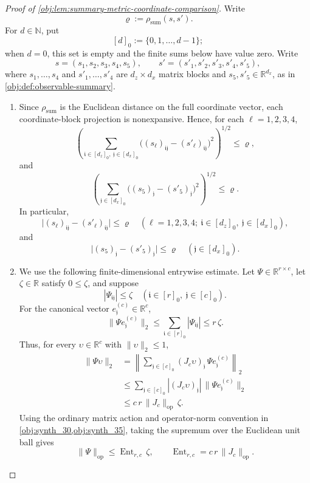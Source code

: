 \documentclass[11pt]{article}
\begin{document}
\begin{proof}[Proof of \cref{obj:lem:summary-metric-coordinate-comparison}]
Write
\[
\varrho:=\rho_{\mathrm{sum}}(s,s').
\]
For \(d\in\mathbb N\), put
\[
[d]_0:=\{0,1,\ldots,d-1\};
\]
when \(d=0\), this set is empty and the finite sums below have value zero.  Write
\[
s=(s_1,s_2,s_3,s_4,s_5),
\qquad
s'=(s'_1,s'_2,s'_3,s'_4,s'_5),
\]
where \(s_1,\ldots,s_4\) and \(s'_1,\ldots,s'_4\) are \(d_z\times d_x\) matrix
blocks and \(s_5,s'_5\in\mathbb R^{d_x}\), as in
\cref{obj:def:observable-summary}.

\begin{enumerate}
\item Since \(\rho_{\mathrm{sum}}\) is the Euclidean distance on the full
coordinate vector, each coordinate-block projection is nonexpansive.  Hence,
for each \(\ell=1,2,3,4\),
\[
\left(
  \sum_{\mathfrak i\in[d_z]_0,\ \mathfrak j\in[d_x]_0}
  \bigl((s_\ell)_{\mathfrak i\mathfrak j}
        -(s'_\ell)_{\mathfrak i\mathfrak j}\bigr)^2
\right)^{1/2}
\le \varrho,
\]
and
\[
\left(
  \sum_{\mathfrak j\in[d_x]_0}
  \bigl((s_5)_{\mathfrak j}-(s'_5)_{\mathfrak j}\bigr)^2
\right)^{1/2}
\le \varrho .
\]
In particular,
\[
\bigl|(s_\ell)_{\mathfrak i\mathfrak j}
      -(s'_\ell)_{\mathfrak i\mathfrak j}\bigr|
\le \varrho
\quad
(\ell=1,2,3,4;\ \mathfrak i\in[d_z]_0,\ \mathfrak j\in[d_x]_0),
\]
and
\[
\bigl|(s_5)_{\mathfrak j}-(s'_5)_{\mathfrak j}\bigr|
\le \varrho
\quad(\mathfrak j\in[d_x]_0).
\]

\item We use the following finite-dimensional entrywise estimate.  Let
\(\Psi\in\mathbb R^{r\times c}\), let \(\zeta\in\mathbb R\) satisfy
\(0\le\zeta\), and suppose
\[
|\Psi_{\mathfrak i\mathfrak j}|\le \zeta
\quad
(\mathfrak i\in[r]_0,\ \mathfrak j\in[c]_0).
\]
For the canonical vector \(e^{(c)}_{\mathfrak j}\in\mathbb R^c\),
\[
\|\Psi e^{(c)}_{\mathfrak j}\|_2
\le
\sum_{\mathfrak i\in[r]_0}|\Psi_{\mathfrak i\mathfrak j}|
\le r\,\zeta .
\]
Thus, for every \(\upsilon\in\mathbb R^c\) with \(\|\upsilon\|_2\le1\),
\[
\begin{aligned}
\|\Psi\upsilon\|_2
&=
\left\|
\sum_{\mathfrak j\in[c]_0}
(J_c\upsilon)_{\mathfrak j}\,\Psi e^{(c)}_{\mathfrak j}
\right\|_2  \\
&\le
\sum_{\mathfrak j\in[c]_0}
|(J_c\upsilon)_{\mathfrak j}|\,
\|\Psi e^{(c)}_{\mathfrak j}\|_2  \\
&\le
c\,r\,\|J_c\|_{\mathrm{op}}\,\zeta .
\end{aligned}
\]
Using the ordinary matrix action and operator-norm convention in
\cref{obj:synth_30,obj:synth_35}, taking the supremum over the Euclidean
unit ball gives
\[
\|\Psi\|_{\mathrm{op}}
\le
\operatorname{Ent}_{r,c}\,\zeta,
\qquad
\operatorname{Ent}_{r,c}=c\,r\,\|J_c\|_{\mathrm{op}} .
\]


\end{enumerate}
\end{proof}
\end{document}
